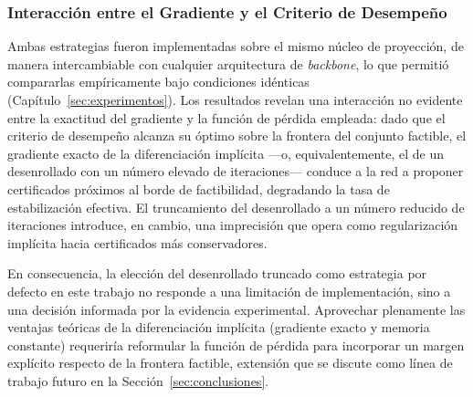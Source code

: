 
\subsubsection{Interacción entre el Gradiente y el Criterio de Desempeño}

Ambas estrategias fueron implementadas sobre el mismo núcleo de proyección, de manera 
intercambiable con cualquier arquitectura de \textit{backbone}, lo que permitió compararlas 
empíricamente bajo condiciones idénticas (Capítulo~\ref{sec:experimentos}). Los resultados 
revelan una interacción no evidente entre la exactitud del gradiente y la función de pérdida 
empleada: dado que el criterio de desempeño alcanza su óptimo sobre la frontera del conjunto 
factible, el gradiente exacto de la diferenciación implícita ---o, equivalentemente, el de un 
desenrollado con un número elevado de iteraciones--- conduce a la red a proponer certificados 
próximos al borde de factibilidad, degradando la tasa de estabilización efectiva. El 
truncamiento del desenrollado a un número reducido de iteraciones introduce, en cambio, una 
imprecisión que opera como regularización implícita hacia certificados más conservadores.

En consecuencia, la elección del desenrollado truncado como estrategia por defecto en este 
trabajo no responde a una limitación de implementación, sino a una decisión informada por la 
evidencia experimental. Aprovechar plenamente las ventajas teóricas de la diferenciación 
implícita (gradiente exacto y memoria constante) requeriría reformular la función de pérdida 
para incorporar un margen explícito respecto de la frontera factible, extensión que se 
discute como línea de trabajo futuro en la Sección~\ref{sec:conclusiones}.








